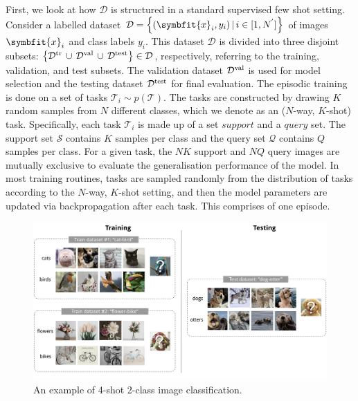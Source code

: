 First, we look at how \(\mathcal{D}\) is structured in a standard supervised few shot setting. 
Consider a labelled dataset $\mathcal{D} = \left\{(\symbfit{x}_i, y_i)\, |\, i \in [1,N^{'}] \right\}$ of images $\symbfit{x}_i$ and class labels $y_i$. 
This dataset $\mathcal{D}$ is divided into three disjoint subsets: $\left\{\mathcal{D}^\textup{tr}\, \cup\, \mathcal{D}^\textup{val}\, \cup\, \mathcal{D}^\textup{test}\right\} \in \mathcal{D}$, respectively, referring to the training, validation, and test subsets. The validation dataset $\mathcal{D}^\textup{val}$ is used for model selection and the testing dataset $\mathcal{D}^\textup{test}$ for final evaluation. The episodic training is done on a set of tasks $\mathcal{T}_i \sim p(\mathcal{T})$. The tasks are constructed by drawing $K$ random samples from $N$ different classes, which we denote as an ($N$-way, $K$-shot) task. 
Specifically, each task $\mathcal{T}_i$ is made up of a set $\textit{support}$ and a $\textit{query}$ set. The support set $\mathcal{S}$ contains $K$ samples per class and the query set $\mathcal{Q}$ contains $Q$ samples per class. For a given task, the $NK$ support and $NQ$ query images are mutually exclusive to evaluate the generalisation performance of the model.
In most training routines, tasks are sampled randomly from the distribution of tasks according to the $N$-way, $K$-shot setting, and then the model parameters are updated via backpropagation after each task. This comprises of one episode. 

\begin{figure}[ht]
    \centering
    \captionsetup{justification=centering}
    \includegraphics[scale=0.4]{chapters/assets/fsl/few-shot-classification.png}
    \caption{An example of 4-shot 2-class image classification.}
    \label{fig:fsl-tasks}
\end{figure}



